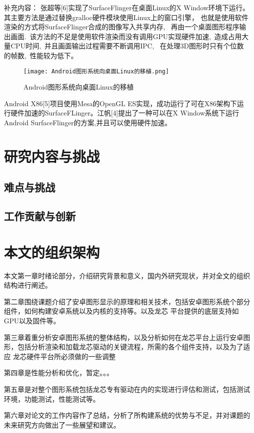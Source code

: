 补充内容：
张超等[6]实现了SurfaceFlinger在桌面Linux的X Window环境下运行。其主要方法是通过替换gralloc硬件模块使用Linux上的窗口引擎，
也就是使用软件渲染的方式将SurfaceFlinger合成的图像写入共享内存,
 再由一个桌面图形程序输出画面. 该方法的不足是使用软件渲染而没有调用GPU实现硬件加速, 造成占用大量CPU时间, 并且画面输出过程需要不断调用IPC,
 在处理3D图形时只有个位数的帧数, 性能较为低下。
\begin{figure}[h]
  \centering
  \texttt{[image: Android图形系统向桌面Linux的移植.png]}
  \caption{Android图形系统向桌面Linux的移植}
\end{figure}

Android X86[5]项目使用Mesa的OpenGL ES实现，成功运行了可在X86架构下运行硬件加速的SurfaceFLinger。江帆[4]提出了一种可以在X Window系统下运行Android SurfaceFlinger的方案,并且可以使用硬件加速。
\section{研究内容与挑战}

\subsection{难点与挑战}
\subsection{工作贡献与创新}

\section{本文的组织架构}
本文第一章时绪论部分，介绍研究背景和意义，国内外研究现状，并对全文的组织结构进行阐述。

第二章围绕课题介绍了安卓图形显示的原理和相关技术，包括安卓图形系统个部分组件，如何构建安卓系统以及内核的支持等。以及龙芯
平台提供的底层支持如GPU以及固件等。

第三章着重分析安卓图形系统的整体结构，以及分析如何在龙芯平台上运行安卓图形，包括分析渲染和加载龙芯驱动的关键流程，所需的各个组件支持，以及为了适应
龙芯硬件平台所必须做的一些调整

第四章是性能分析和优化，暂定。。。

第五章是对整个图形系统包括龙芯专有驱动在内的实现进行评估和测试，包括测试环境，功能测试，性能测试等。

第六章对论文的工作内容作了总结，分析了所构建系统的优势与不足，并对课题的未来研究方向做出了一些展望和建议。

